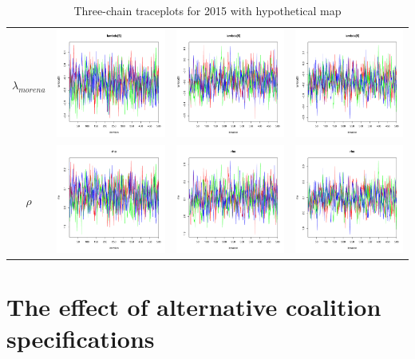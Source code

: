 \documentclass[letter,12pt]{article}
\begin{document}
\begin{table}
\begin{tabular}{cccc}
    $\lambda_{morena}$ & \includegraphics[width=.15\columnwidth]{../graphs/traceplots/2015d3v_6.pdf} &
                        \includegraphics[width=.15\columnwidth]{../graphs/traceplots/2015d3vbar_6.pdf} &
                         \includegraphics[width=.15\columnwidth]{../graphs/traceplots/2015d3wbar_6.pdf} \\
    $\rho$           & \includegraphics[width=.15\columnwidth]{../graphs/traceplots/2015d3v_7.pdf} &
                        \includegraphics[width=.15\columnwidth]{../graphs/traceplots/2015d3vbar_7.pdf} &
                         \includegraphics[width=.15\columnwidth]{../graphs/traceplots/2015d3wbar_7.pdf} \\
\end{tabular}
\caption{Three-chain traceplots for 2015 with hypothetical map}\label{T:traceplotEnd}
\end{table}

\section{The effect of alternative coalition specifications}
\end{document}
